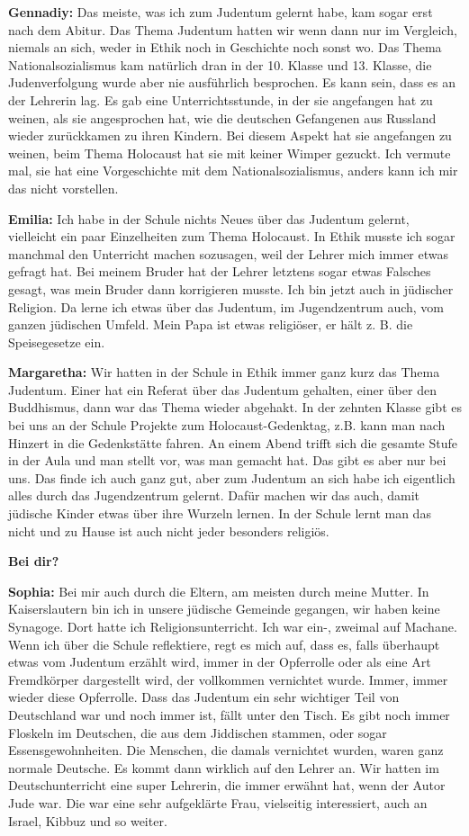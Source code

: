 \textbf{Gennadiy:} Das meiste, was ich zum Judentum gelernt habe, kam sogar erst nach dem Abitur. Das Thema Judentum hatten wir wenn dann nur im Vergleich, niemals an sich, weder in Ethik noch in Geschichte noch sonst wo. Das Thema Nationalsozialismus kam natürlich dran in der 10. Klasse und 13. Klasse, die Judenverfolgung wurde aber nie ausführlich besprochen. Es kann sein, dass es an der Lehrerin lag. Es gab eine Unterrichtsstunde, in der sie angefangen hat zu weinen, als sie angesprochen hat, wie die deutschen Gefangenen aus Russland wieder zurückkamen zu ihren Kindern. Bei diesem Aspekt hat sie angefangen zu weinen, beim Thema Holocaust hat sie mit keiner Wimper gezuckt. Ich vermute mal, sie hat eine Vorgeschichte mit dem Nationalsozialismus, anders kann ich mir das nicht vorstellen. 

\textbf{Emilia:} Ich habe in der Schule nichts Neues über das Judentum gelernt, vielleicht ein paar Einzelheiten zum Thema Holocaust. In Ethik musste ich sogar manchmal den Unterricht machen sozusagen, weil der Lehrer mich immer etwas gefragt hat. Bei meinem Bruder hat der Lehrer letztens sogar etwas Falsches gesagt, was mein Bruder dann korrigieren musste. Ich bin jetzt auch in jüdischer Religion. Da lerne ich etwas über das Judentum, im Jugendzentrum auch, vom ganzen jüdischen Umfeld. Mein Papa ist etwas religiöser, er hält z. B. die Speisegesetze ein. 

\textbf{Margaretha:} Wir hatten in der Schule in Ethik immer ganz kurz das Thema Judentum. Einer hat ein Referat über das Judentum gehalten, einer über den Buddhismus, dann war das Thema wieder abgehakt. In der zehnten Klasse gibt es bei uns an der Schule Projekte zum Holocaust-Gedenktag, z.B. kann man nach Hinzert in die Gedenkstätte fahren. An einem Abend trifft sich die gesamte Stufe in der Aula und man stellt vor, was man gemacht hat. Das gibt es aber nur bei uns. Das finde ich auch ganz gut, aber zum Judentum an sich habe ich eigentlich alles durch das Jugendzentrum gelernt. Dafür machen wir das auch, damit jüdische Kinder etwas über ihre Wurzeln lernen. In der Schule lernt man das nicht und zu Hause ist auch nicht jeder besonders religiös. 

\textbf{Bei dir?} 

\textbf{Sophia:} Bei mir auch durch die Eltern, am meisten durch meine Mutter. In Kaiserslautern bin ich in unsere jüdische Gemeinde gegangen, wir haben keine Synagoge. Dort hatte ich Religionsunterricht. Ich war ein-, zweimal auf Machane. Wenn ich über die Schule reflektiere, regt es mich auf, dass es, falls überhaupt etwas vom Judentum erzählt wird, immer in der Opferrolle oder als eine Art Fremdkörper dargestellt wird, der vollkommen vernichtet wurde. Immer, immer wieder diese Opferrolle. Dass das Judentum ein sehr wichtiger Teil von Deutschland war und noch immer ist, fällt unter den Tisch. Es gibt noch immer Floskeln im Deutschen, die aus dem Jiddischen stammen, oder sogar Essensgewohnheiten. Die Menschen, die damals vernichtet wurden, waren ganz normale Deutsche. Es kommt dann wirklich auf den Lehrer an. Wir hatten im Deutschunterricht eine super Lehrerin, die immer erwähnt hat, wenn der Autor Jude war. Die war eine sehr aufgeklärte Frau, vielseitig interessiert, auch an Israel, Kibbuz und so weiter. 

